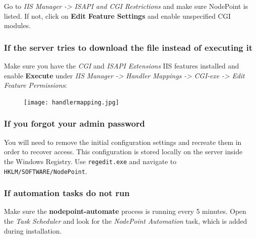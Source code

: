 \documentclass[11pt]{article}
\begin{document}
{Go to \textit{IIS Manager -> ISAPI and CGI Restrictions} and make sure NodePoint is listed. If not, click on \textbf{Edit Feature Settings} and enable unspecified CGI modules.

\subsubsection{If the server tries to download the file instead of executing it}

Make sure you have the \textit{CGI} and \textit{ISAPI Extensions} IIS features installed and enable \textbf{Execute} under \textit{IIS Manager -> Handler Mappings -> CGI-exe -> Edit Feature Permissions}:

\begin{figure}[h]
\texttt{[image: handlermapping.jpg]}
\end{figure}

\subsubsection{If you forgot your admin password}

You will need to remove the initial configuration settings and recreate them in order to recover access. This configuration is stored locally on the server inside the Windows Registry. Use \texttt{regedit.exe} and navigate to \texttt{HKLM/SOFTWARE/NodePoint}.

\subsubsection{If automation tasks do not run}

Make sure the \textbf{nodepoint-automate} process is running every 5 minutes. Open the \textit{Task Scheduler} and look for the \textit{NodePoint Automation} task, which is added during installation.
}
\end{document}
